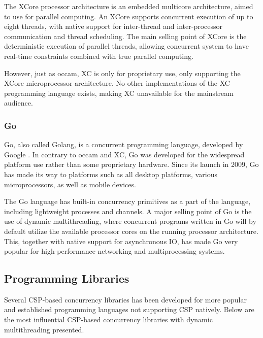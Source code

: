 The XCore processor architecture is an embedded multicore architecture, aimed to use for parallel computing. An XCore supports concurrent execution of up to eight threads, with native support for inter\hyp{}thread and inter\hyp{}processor communication and thread scheduling. The main selling point of XCore is the deterministic execution of parallel threads, allowing concurrent system to have real\hyp{}time constraints combined with true parallel computing.

However, just as occam, XC is only for proprietary use, only supporting the XCore microprocessor architecture. No other implementations of the XC programming language exists, making XC unavailable for the mainstream audience.


\subsubsection{Go}


Go, also called Golang, is a concurrent programming language, developed by Google \citep{balbaert2012way}. In contrary to occam and XC, Go was developed for the widespread platform use rather than some proprietary hardware. Since its launch in 2009, Go has made its way to platforms such as all desktop platforms, various microprocessors, as well as mobile devices. 

The Go language has built\hyp{}in concurrency primitives as a part of the language, including lightweight processes and channels. A major selling point of Go is the use of dynamic multithreading, where concurrent programs written in Go will by default utilize the available processor cores on the running processor architecture. This, together with native support for asynchronous IO, has made Go very popular for high\hyp{}performance networking and multiprocessing systems.


\subsection{Programming Libraries}


Several CSP\hyp{}based concurrency libraries has been developed for more popular and established programming languages not supporting CSP natively. Below are the most influential CSP\hyp{}based concurrency libraries with dynamic multithreading presented.


\subsubsection{}


